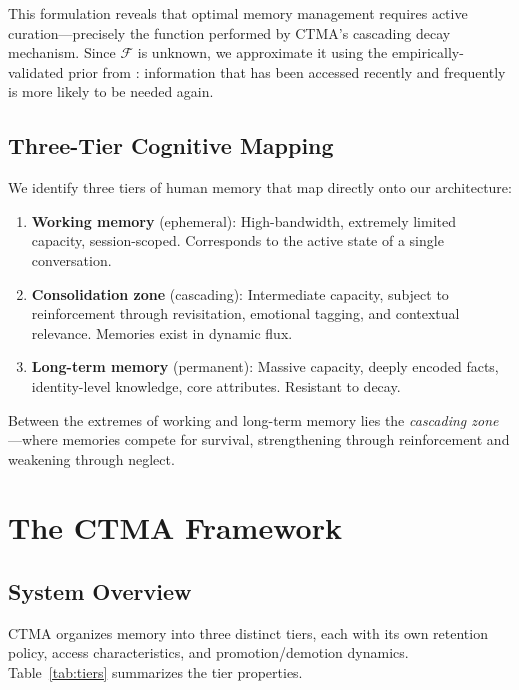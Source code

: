 \documentclass[11pt,a4paper]{article}
\begin{document}
This formulation reveals that optimal memory management requires active curation---precisely the function performed by CTMA's cascading decay mechanism. Since $\mathcal{F}$ is unknown, we approximate it using the empirically-validated prior from \citet{anderson1991reflections}: information that has been accessed recently and frequently is more likely to be needed again.

\subsection{Three-Tier Cognitive Mapping}

We identify three tiers of human memory that map directly onto our architecture:

\begin{enumerate}[label=(\roman*)]
  \item \textbf{Working memory} (ephemeral): High-bandwidth, extremely limited capacity, session-scoped. Corresponds to the active state of a single conversation.
  \item \textbf{Consolidation zone} (cascading): Intermediate capacity, subject to reinforcement through revisitation, emotional tagging, and contextual relevance. Memories exist in dynamic flux.
  \item \textbf{Long-term memory} (permanent): Massive capacity, deeply encoded facts, identity-level knowledge, core attributes. Resistant to decay.
\end{enumerate}

Between the extremes of working and long-term memory lies the \textit{cascading zone}---where memories compete for survival, strengthening through reinforcement and weakening through neglect.


\section{The CTMA Framework}
\label{sec:framework}

\subsection{System Overview}

CTMA organizes memory into three distinct tiers, each with its own retention policy, access characteristics, and promotion/demotion dynamics. Table~\ref{tab:tiers} summarizes the tier properties.
\end{document}
